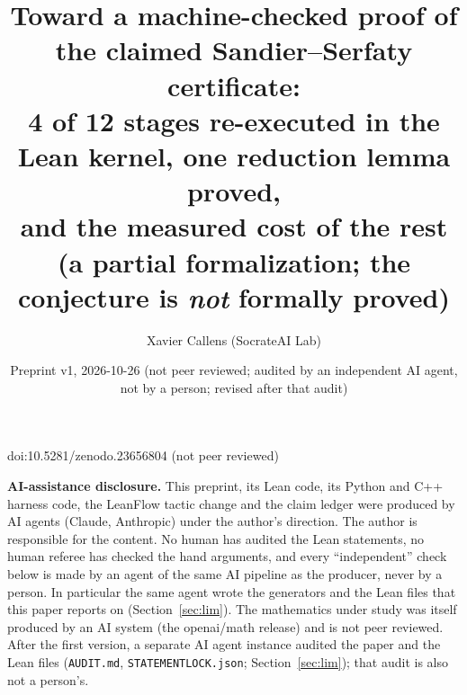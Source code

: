 \documentclass[10pt]{article}
\title{Toward a machine-checked proof of the claimed Sandier--Serfaty certificate:\\
4 of 12 stages re-executed in the Lean kernel, one reduction lemma proved,\\
and the measured cost of the rest\\[2pt]
{\large (a partial formalization; the conjecture is \emph{not} formally proved)}}
\author{Xavier Callens (SocrateAI Lab)}
\date{Preprint v1, 2026-10-26 \quad (not peer reviewed; audited by an independent AI agent, not by a person; revised after that audit)}
\renewcommand{\_}{\textunderscore\allowbreak}
\begin{document}
\maketitle
\begin{center}\small doi:10.5281/zenodo.23656804 \quad (not peer reviewed)\end{center}


\noindent\textbf{AI-assistance disclosure.} This preprint, its Lean code, its Python and C++ harness code, the LeanFlow tactic change and
the claim ledger were produced by AI agents (Claude, Anthropic) under the author's direction. The author is responsible for the content.
No human has audited the Lean statements, no human referee has checked the hand arguments, and every ``independent'' check below is made
by an agent of the same AI pipeline as the producer, never by a person. In particular the same agent wrote the generators and the Lean
files that this paper reports on (Section~\ref{sec:lim}). The mathematics under study was itself produced by an AI system (the openai/math
release) and is not peer reviewed. After the first version, a separate AI agent instance audited the paper and the Lean files (\texttt{AUDIT.md}, \texttt{STATEMENT\_LOCK.json}; Section~\ref{sec:lim}); that audit is also not a person's.
\end{document}
